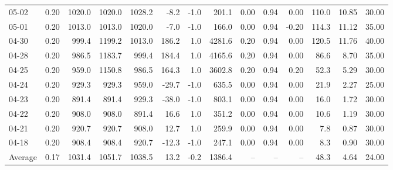 \begin{threeparttable}
{\begin{tabular}{lrrrrrrrrrrrrr}
  05-02 &     0.20 & 1020.0 & 1020.0 & 1028.2 &       -8.2 &                     -1.0 &               201.1 &       0.00 &      0.94 &           0.00 &            110.0 &           10.85 &                  30.00 \\
  05-01 &     0.20 & 1013.0 & 1013.0 & 1020.0 &       -7.0 &                     -1.0 &               166.0 &       0.00 &      0.94 &          -0.20 &            114.3 &           11.12 &                  35.00 \\
  04-30 &     0.20 &  999.4 & 1199.2 & 1013.0 &      186.2 &                      1.0 &              4281.6 &       0.20 &      0.94 &           0.00 &            120.5 &           11.76 &                  40.00 \\
  04-28 &     0.20 &  986.5 & 1183.7 &  999.4 &      184.4 &                      1.0 &              4165.6 &       0.20 &      0.94 &           0.00 &             86.6 &            8.70 &                  35.00 \\
  04-25 &     0.20 &  959.0 & 1150.8 &  986.5 &      164.3 &                      1.0 &              3602.8 &       0.20 &      0.94 &           0.20 &             52.3 &            5.29 &                  30.00 \\
  04-24 &     0.20 &  929.3 &  929.3 &  959.0 &      -29.7 &                     -1.0 &               635.5 &       0.00 &      0.94 &           0.00 &             21.9 &            2.27 &                  25.00 \\
  04-23 &     0.20 &  891.4 &  891.4 &  929.3 &      -38.0 &                     -1.0 &               803.1 &       0.00 &      0.94 &           0.00 &             16.0 &            1.72 &                  30.00 \\
  04-22 &     0.20 &  908.0 &  908.0 &  891.4 &       16.6 &                      1.0 &               351.2 &       0.00 &      0.94 &           0.00 &             10.6 &            1.19 &                  30.00 \\
  04-21 &     0.20 &  920.7 &  920.7 &  908.0 &       12.7 &                      1.0 &               259.9 &       0.00 &      0.94 &           0.00 &              7.8 &            0.87 &                  30.00 \\
  04-18 &     0.20 &  908.4 &  908.4 &  920.7 &      -12.3 &                     -1.0 &               247.1 &       0.00 &      0.94 &           0.00 &              8.3 &            0.90 &                  30.00 \\
Average &     0.17 & 1031.4 & 1051.7 & 1038.5 &       13.2 &                     -0.2 &              1386.4 &         -- &        -- &             -- &             48.3 &            4.64 &                  24.00 \\

\end{tabular}}
\end{threeparttable}
